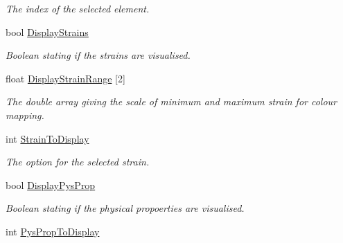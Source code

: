 \begin{DoxyCompactItemize}
\begin{DoxyCompactList}\small\item\em The index of the selected element. \end{DoxyCompactList}\item 
\hypertarget{classGLWidget_a314984029a390e02a2d4235c5c2741a5}{}bool \hyperlink{classGLWidget_a314984029a390e02a2d4235c5c2741a5}{Display\+Strains}\label{classGLWidget_a314984029a390e02a2d4235c5c2741a5}

\begin{DoxyCompactList}\small\item\em Boolean stating if the strains are visualised. \end{DoxyCompactList}\item 
\hypertarget{classGLWidget_a753550713effac7b997844f2759c6129}{}float \hyperlink{classGLWidget_a753550713effac7b997844f2759c6129}{Display\+Strain\+Range} \mbox{[}2\mbox{]}\label{classGLWidget_a753550713effac7b997844f2759c6129}

\begin{DoxyCompactList}\small\item\em The double array giving the scale of minimum and maximum strain for colour mapping. \end{DoxyCompactList}\item 
\hypertarget{classGLWidget_ae95a720ff47f77ab05229d6502223c6f}{}int \hyperlink{classGLWidget_ae95a720ff47f77ab05229d6502223c6f}{Strain\+To\+Display}\label{classGLWidget_ae95a720ff47f77ab05229d6502223c6f}

\begin{DoxyCompactList}\small\item\em The option for the selected strain. \end{DoxyCompactList}\item 
\hypertarget{classGLWidget_a9a990de1ec4c0e18778611cb0159eac8}{}bool \hyperlink{classGLWidget_a9a990de1ec4c0e18778611cb0159eac8}{Display\+Pys\+Prop}\label{classGLWidget_a9a990de1ec4c0e18778611cb0159eac8}

\begin{DoxyCompactList}\small\item\em Boolean stating if the physical propoerties are visualised. \end{DoxyCompactList}\item 
\hypertarget{classGLWidget_a478ab24d1ae3c646f40afedb72b725ae}{}int \hyperlink{classGLWidget_a478ab24d1ae3c646f40afedb72b725ae}{Pys\+Prop\+To\+Display}\label{classGLWidget_a478ab24d1ae3c646f40afedb72b725ae}


\end{DoxyCompactItemize}
